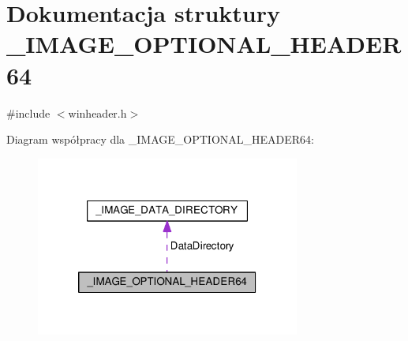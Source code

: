 \hypertarget{struct___i_m_a_g_e___o_p_t_i_o_n_a_l___h_e_a_d_e_r64}{\section{Dokumentacja struktury \-\_\-\-I\-M\-A\-G\-E\-\_\-\-O\-P\-T\-I\-O\-N\-A\-L\-\_\-\-H\-E\-A\-D\-E\-R64}
\label{struct___i_m_a_g_e___o_p_t_i_o_n_a_l___h_e_a_d_e_r64}
}


{\ttfamily \#include $<$winheader.\-h$>$}



Diagram współpracy dla \-\_\-\-I\-M\-A\-G\-E\-\_\-\-O\-P\-T\-I\-O\-N\-A\-L\-\_\-\-H\-E\-A\-D\-E\-R64\-:
\nopagebreak
\begin{figure}[H]
\begin{center}
\leavevmode
\includegraphics[width=246pt]{struct___i_m_a_g_e___o_p_t_i_o_n_a_l___h_e_a_d_e_r64__coll__graph}
\end{center}
\end{figure}
